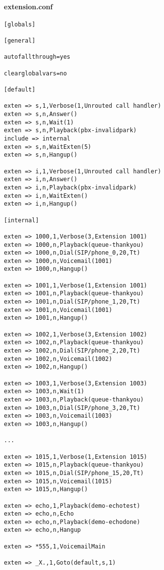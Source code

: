\documentclass[a4paper,12pt]{report}
\newenvironment{myscriptlisting}
{\begin{list}{}{\setlength{\leftmargin}{1em}}\item\scriptsize\bfseries}
{\end{list}}
\begin{document}
\paragraph{extension.conf}
\begin{myscriptlisting}
\begin{verbatim}
[globals]

[general]

autofallthrough=yes

clearglobalvars=no

[default]

exten => s,1,Verbose(1,Unrouted call handler)
exten => s,n,Answer()
exten => s,n,Wait(1)
exten => s,n,Playback(pbx-invalidpark)
include => internal
exten => s,n,WaitExten(5)                               
exten => s,n,Hangup() 

exten => i,1,Verbose(1,Unrouted call handler)
exten => i,n,Answer()
exten => i,n,Playback(pbx-invalidpark)
exten => i,n,WaitExten()
exten => i,n,Hangup() 

[internal]

exten => 1000,1,Verbose(3,Extension 1001)
exten => 1000,n,Playback(queue-thankyou)
exten => 1000,n,Dial(SIP/phone_0,20,Tt) 
exten => 1000,n,Voicemail(1001)
exten => 1000,n,Hangup()

exten => 1001,1,Verbose(1,Extension 1001)
exten => 1001,n,Playback(queue-thankyou)
exten => 1001,n,Dial(SIP/phone_1,20,Tt) 
exten => 1001,n,Voicemail(1001)
exten => 1001,n,Hangup()

exten => 1002,1,Verbose(3,Extension 1002)
exten => 1002,n,Playback(queue-thankyou)
exten => 1002,n,Dial(SIP/phone_2,20,Tt) 
exten => 1002,n,Voicemail(1002)
exten => 1002,n,Hangup()

exten => 1003,1,Verbose(3,Extension 1003)
exten => 1003,n,Wait(1) 
exten => 1003,n,Playback(queue-thankyou)
exten => 1003,n,Dial(SIP/phone_3,20,Tt) 
exten => 1003,n,Voicemail(1003)
exten => 1003,n,Hangup()

...

exten => 1015,1,Verbose(1,Extension 1015)
exten => 1015,n,Playback(queue-thankyou)
exten => 1015,n,Dial(SIP/phone_15,20,Tt) 
exten => 1015,n,Voicemail(1015)
exten => 1015,n,Hangup()

exten => echo,1,Playback(demo-echotest) 
exten => echo,n,Echo
exten => echo,n,Playback(demo-echodone)
exten => echo,n,Hangup

exten => *555,1,VoicemailMain

exten => _X.,1,Goto(default,s,1)
\end{verbatim}
\end{myscriptlisting}
\end{document}
